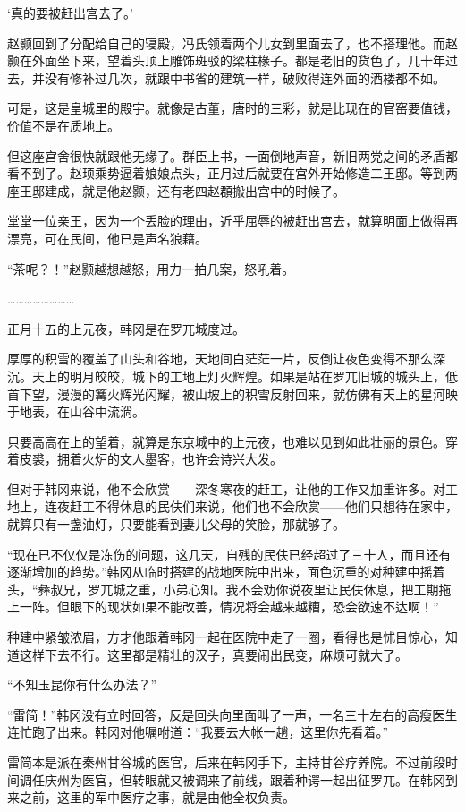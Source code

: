 ‘真的要被赶出宫去了。’

赵颢回到了分配给自己的寝殿，冯氏领着两个儿女到里面去了，也不搭理他。而赵颢在外面坐下来，望着头顶上雕饰斑驳的梁柱椽子。都是老旧的货色了，几十年过去，并没有修补过几次，就跟中书省的建筑一样，破败得连外面的酒楼都不如。

可是，这是皇城里的殿宇。就像是古董，唐时的三彩，就是比现在的官窑要值钱，价值不是在质地上。

但这座宫舍很快就跟他无缘了。群臣上书，一面倒地声音，新旧两党之间的矛盾都看不到了。赵顼乘势逼着娘娘点头，正月过后就要在宫外开始修造二王邸。等到两座王邸建成，就是他赵颢，还有老四赵頵搬出宫中的时候了。

堂堂一位亲王，因为一个丢脸的理由，近乎屈辱的被赶出宫去，就算明面上做得再漂亮，可在民间，他已是声名狼藉。

“茶呢？！”赵颢越想越怒，用力一拍几案，怒吼着。

……………………

正月十五的上元夜，韩冈是在罗兀城度过。

厚厚的积雪的覆盖了山头和谷地，天地间白茫茫一片，反倒让夜色变得不那么深沉。天上的明月皎皎，城下的工地上灯火辉煌。如果是站在罗兀旧城的城头上，低首下望，漫漫的篝火辉光闪耀，被山坡上的积雪反射回来，就仿佛有天上的星河映于地表，在山谷中流淌。

只要高高在上的望着，就算是东京城中的上元夜，也难以见到如此壮丽的景色。穿着皮裘，拥着火炉的文人墨客，也许会诗兴大发。

但对于韩冈来说，他不会欣赏——深冬寒夜的赶工，让他的工作又加重许多。对工地上，连夜赶工不得休息的民伕们来说，他们也不会欣赏——他们只想待在家中，就算只有一盏油灯，只要能看到妻儿父母的笑脸，那就够了。

“现在已不仅仅是冻伤的问题，这几天，自残的民伕已经超过了三十人，而且还有逐渐增加的趋势。”韩冈从临时搭建的战地医院中出来，面色沉重的对种建中摇着头，“彝叔兄，罗兀城之重，小弟心知。我不会劝你说夜里让民伕休息，把工期拖上一阵。但眼下的现状如果不能改善，情况将会越来越糟，恐会欲速不达啊！”

种建中紧皱浓眉，方才他跟着韩冈一起在医院中走了一圈，看得也是怵目惊心，知道这样下去不行。这里都是精壮的汉子，真要闹出民变，麻烦可就大了。

“不知玉昆你有什么办法？”

“雷简！”韩冈没有立时回答，反是回头向里面叫了一声，一名三十左右的高瘦医生连忙跑了出来。韩冈对他嘱咐道：“我要去大帐一趟，这里你先看着。”

雷简本是派在秦州甘谷城的医官，后来在韩冈手下，主持甘谷疗养院。不过前段时间调任庆州为医官，但转眼就又被调来了前线，跟着种谔一起出征罗兀。在韩冈到来之前，这里的军中医疗之事，就是由他全权负责。

